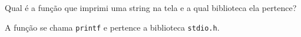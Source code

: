 \begin{Exercise}[label={0001}, difficulty={1}, origin={io}]
  Qual é a função que imprimi uma string na tela e a qual biblioteca ela
  pertence?
\end{Exercise}
\begin{Answer}[ref={0001}]
  A função se chama \lstinline+printf+ e pertence a biblioteca
  \lstinline+stdio.h+.
\end{Answer}
